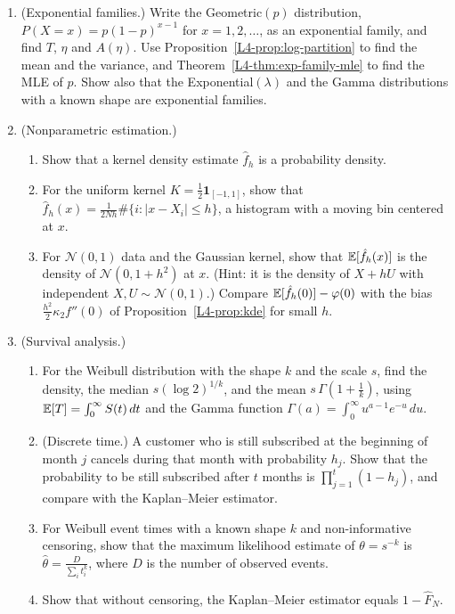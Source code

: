\begin{enumerate}[leftmargin=*]
    \item (Exponential families.) Write the Geometric$(p)$ distribution, $P(X = x) = p(1 - p)^{x - 1}$ for $x = 1, 2, \ldots$, as an exponential family, and find $T$, $\eta$ and $A(\eta)$. Use Proposition~\ref{L4-prop:log-partition} to find the mean and the variance, and Theorem~\ref{L4-thm:exp-family-mle} to find the MLE of $p$. Show also that the Exponential$(\lambda)$ and the Gamma distributions with a known shape are exponential families.
    \item (Nonparametric estimation.)
    \begin{enumerate}[label=(\alph*)]
        \item Show that a kernel density estimate $\hat f_h$ is a probability density.
        \item For the uniform kernel $K = \frac{1}{2}\mathbf{1}_{[-1, 1]}$, show that $\hat f_h(x) = \frac{1}{2Nh}\#\{i : |x - X_i| \leq h\}$, a histogram with a moving bin centered at $x$.
        \item For $\mathcal{N}(0, 1)$ data and the Gaussian kernel, show that $\mathbb{E}[\hat f_h(x)]$ is the density of $\mathcal{N}(0, 1 + h^2)$ at $x$. (Hint: it is the density of $X + hU$ with independent $X, U \sim \mathcal{N}(0, 1)$.) Compare $\mathbb{E}[\hat f_h(0)] - \varphi(0)$ with the bias $\frac{h^2}{2}\kappa_2f''(0)$ of Proposition~\ref{L4-prop:kde} for small $h$.
    \end{enumerate}
    \item (Survival analysis.)
    \begin{enumerate}[label=(\alph*)]
        \item For the Weibull distribution with the shape $k$ and the scale $s$, find the density, the median $s(\log 2)^{1/k}$, and the mean $s\,\Gamma(1 + \frac{1}{k})$, using $\mathbb{E}[T] = \int_0^\infty S(t)\, dt$ and the Gamma function $\Gamma(a) = \int_0^\infty u^{a-1}e^{-u}\, du$.
        \item (Discrete time.) A customer who is still subscribed at the beginning of month $j$ cancels during that month with probability $h_j$. Show that the probability to be still subscribed after $t$ months is $\prod_{j=1}^t (1 - h_j)$, and compare with the Kaplan--Meier estimator.
        \item For Weibull event times with a known shape $k$ and non-informative censoring, show that the maximum likelihood estimate of $\theta = s^{-k}$ is $\hat\theta = \frac{D}{\sum_i t_i^k}$, where $D$ is the number of observed events.
        \item Show that without censoring, the Kaplan--Meier estimator equals $1 - \hat F_N$.

\end{enumerate}
\end{enumerate}
